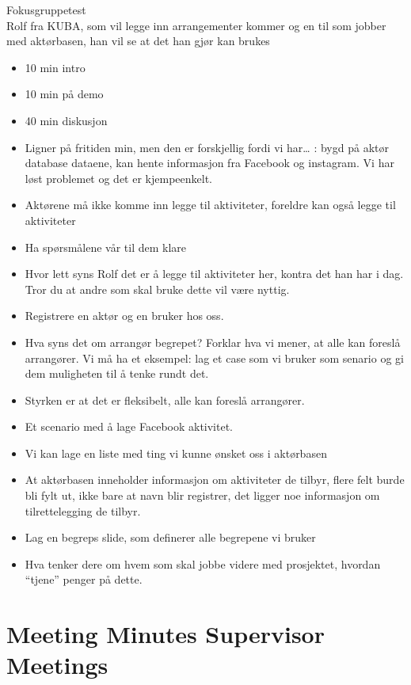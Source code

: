 {\large{Fokusgruppetest}} \\
Rolf fra KUBA, som vil legge inn arrangementer kommer og en til som jobber med aktørbasen, han vil se at det han gjør kan brukes
\begin{itemize}  
    \item 10 min intro
    \item 10 min på demo
    \item 40 min diskusjon
    \item Ligner på fritiden min, men den er forskjellig fordi vi har… : bygd på aktør database dataene, kan hente informasjon fra Facebook og instagram. Vi har løst problemet og det er kjempeenkelt.
    \item Aktørene må ikke komme inn legge til aktiviteter, foreldre kan også legge til aktiviteter 
    \item Ha spørsmålene vår til dem klare
    \item Hvor lett syns Rolf det er å legge til aktiviteter her, kontra det han har i dag. Tror du at andre som skal bruke dette vil være nyttig.
    \item Registrere en aktør og en bruker hos oss.
    \item Hva syns det om arrangør begrepet? Forklar hva vi mener, at alle kan foreslå arrangører. Vi må ha et eksempel: lag et case som vi bruker som senario og gi dem muligheten til å tenke rundt det.
    \item Styrken er at det er fleksibelt, alle kan foreslå arrangører.
    \item Et scenario med å lage Facebook aktivitet.
    \item Vi kan lage en liste med ting vi kunne ønsket oss i aktørbasen
    \item At aktørbasen inneholder informasjon om aktiviteter de tilbyr, flere felt burde bli fylt ut, ikke bare at navn blir registrer, det ligger noe informasjon om tilrettelegging de tilbyr.
    \item Lag en begreps slide, som definerer alle begrepene vi bruker
    \item Hva tenker dere om hvem som skal jobbe videre med prosjektet, hvordan “tjene” penger på dette.
\end{itemize}


\section{Meeting Minutes Supervisor Meetings}
\label{meeting_minutes_supervisor_meetings}


